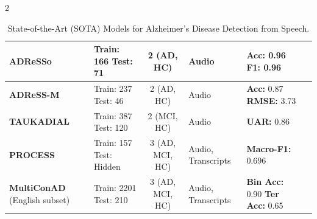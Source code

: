 \documentclass[10pt]{article}
\begin{document}
\begin{multicols}{2}
\begin{table}[htbp]
\begin{tabular}{@{}p{2.5cm} p{2.2cm} cp{2.8cm} p{2.5cm} p{2.5cm}@{}}
\textbf{ADReSSo} & Train: 166 \newline Test: 71 & 2 (AD, HC) & Audio &
\textbf{Acc:} 0.96 \newline \textbf{F1:} 0.96 &
\cite{ntampakisNeuroXVocalDetectionExplanation2026} \\
\midrule

\textbf{ADReSS-M} & Train: 237 \newline Test: 46 & 2 (AD, HC) &
Audio & \textbf{Acc:} 0.87 \newline \textbf{RMSE:} 3.73 &
\cite{chenCrossLingualAlzheimersDisease2023} \\
\midrule

\textbf{TAUKADIAL} & Train: 387 \newline Test: 120 & 2 (MCI, HC) & Audio &
\textbf{UAR:} 0.86 &
\cite{inproceedings} \\
\midrule

\textbf{PROCESS} & Train: 157 \newline Test: Hidden & 3 (AD, MCI, HC) &
Audio, Transcripts & \textbf{Macro-F1:} 0.696 &
\cite{zhangCognitiveDeclineDetection2025} \\
\midrule

\textbf{MultiConAD} (English subset) & Train: 2201 \newline Test: 210 & 3 (AD, MCI, HC) &
Audio, Transcripts & \textbf{Bin Acc:} 0.90 \newline \textbf{Ter Acc:} 0.65 &
\cite{shakeriMultiConADUnifiedMultilingual2025} \\
\bottomrule

\end{tabular}
\caption{State-of-the-Art (SOTA) Models for Alzheimer's Disease Detection from Speech.}
\label{tab:sota}
\end{table}


\end{multicols}
\end{document}
